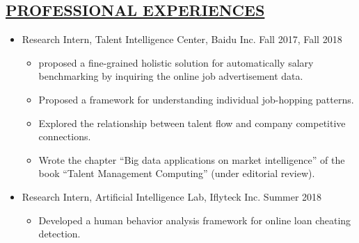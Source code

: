 \documentclass[11pt,letterpage]{res}
\begin{document}
\begin{resume}
\section{\underline{PROFESSIONAL EXPERIENCES}}
\begin{itemize}
	\item Research Intern, Talent Intelligence Center, Baidu Inc.  Fall 2017, Fall 2018
	\begin{itemize}
		\item proposed a fine-grained holistic solution for automatically salary benchmarking by inquiring the online job advertisement data.
		\item Proposed a framework for understanding individual job-hopping patterns.
		\item Explored the relationship between talent flow and company competitive connections.
		\item Wrote the chapter ``Big data applications on market intelligence'' of the book ``Talent Management Computing'' (under editorial review).
	\end{itemize}
	\item Research Intern, Artificial Intelligence Lab, Iflyteck Inc. Summer 2018
	\begin{itemize}
		\item Developed a human behavior analysis framework for online loan cheating detection.
	\end{itemize} 
\end{itemize}


\end{resume}
\end{document}
